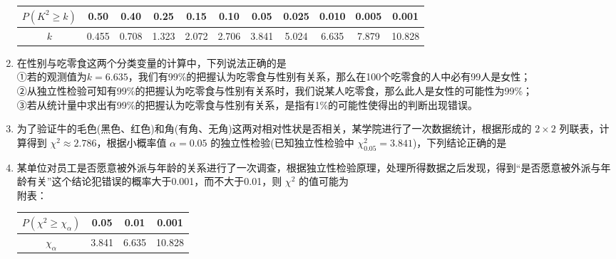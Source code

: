 \begin{enumerate}
\begin{center}
\begin{tabular}{|c|c|c|c|c|c|c|c|c|c|c|}
\hline
$P(K^{2}\ge k)$ & 0.50 & 0.40 & 0.25 & 0.15 & 0.10 & 0.05 & 0.025 & 0.010 & 0.005 & 0.001 \\
\hline
$k$ & 0.455 & 0.708 & 1.323 & 2.072 & 2.706 & 3.841 & 5.024 & 6.635 & 7.879 & 10.828 \\
\hline
\end{tabular}
\end{center}

\item 在性别与吃零食这两个分类变量的计算中，下列说法正确的是\\
①若的观测值为$k=6.635$，我们有99\%的把握认为吃零食与性别有关系，那么在100个吃零食的人中必有99人是女性；\\
②从独立性检验可知有99\%的把握认为吃零食与性别有关系时，我们说某人吃零食，那么此人是女性的可能性为99\%；\\
③若从统计量中求出有99\%的把握认为吃零食与性别有关系，是指有1\%的可能性使得出的判断出现错误。

\item 为了验证牛的毛色(黑色、红色)和角(有角、无角)这两对相对性状是否相关，某学院进行了一次数据统计，根据形成的 $2\times 2$ 列联表，计算得到 $\chi^{2}\approx 2.786$，根据小概率值 $\alpha=0.05$ 的独立性检验(已知独立性检验中 $\chi^{2}_{0.05}=3.841$)，下列结论正确的是

\item 某单位对员工是否愿意被外派与年龄的关系进行了一次调查，根据独立性检验原理，处理所得数据之后发现，得到“是否愿意被外派与年龄有关”这个结论犯错误的概率大于0.001，而不大于0.01，则 $\chi^{2}$ 的值可能为\\
附表：
\begin{center}
\begin{tabular}{|c|c|c|c|}
\hline
$P(\chi^{2}\ge\chi_{\alpha})$ & 0.05 & 0.01 & 0.001 \\
\hline
$\chi_{\alpha}$ & 3.841 & 6.635 & 10.828 \\
\hline
\end{tabular}
\end{center}



\end{enumerate}
